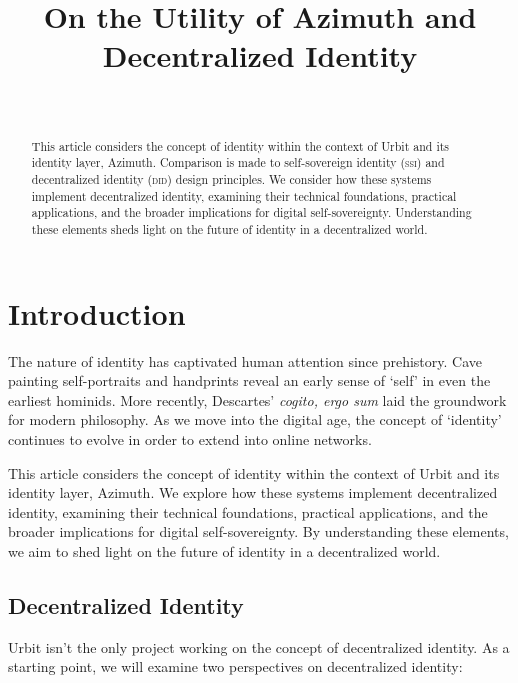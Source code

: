 \documentclass[twoside]{article}
\title{On the Utility of Azimuth and Decentralized Identity}
\author{\authorname~\authorpatp \\ \affiliation}
\date{}
\begin{document}
\maketitle
\thispagestyle{firststyle}

\begin{abstract}
  This article considers the concept of identity within the context of Urbit and its identity layer, Azimuth.  Comparison is made to self-sovereign identity (\textsc{ssi}) and decentralized identity (\textsc{did}) design principles.  We consider how these systems implement decentralized identity, examining their technical foundations, practical applications, and the broader implications for digital self-sovereignty.  Understanding these elements sheds light on the future of identity in a decentralized world.
\end{abstract}

\setcounter{page}{9}

\tableofcontents

\section{Introduction}

The nature of identity has captivated human attention since prehistory. Cave painting self-portraits and handprints reveal an early sense of `self' in even the earliest hominids. More recently, Descartes' \emph{cogito, ergo sum} laid the groundwork for modern philosophy. As we move into the digital age, the concept of `identity' continues to evolve in order to extend into online networks.

This article considers the concept of identity within the context of Urbit and its identity layer, Azimuth. We explore how these systems implement decentralized identity, examining their technical foundations, practical applications, and the broader implications for digital self-sovereignty. By understanding these elements, we aim to shed light on the future of identity in a decentralized world.

\subsection{Decentralized Identity}

Urbit isn't the only project working on the concept of decentralized identity. As a starting point, we will examine two perspectives on decentralized identity:
\end{document}
